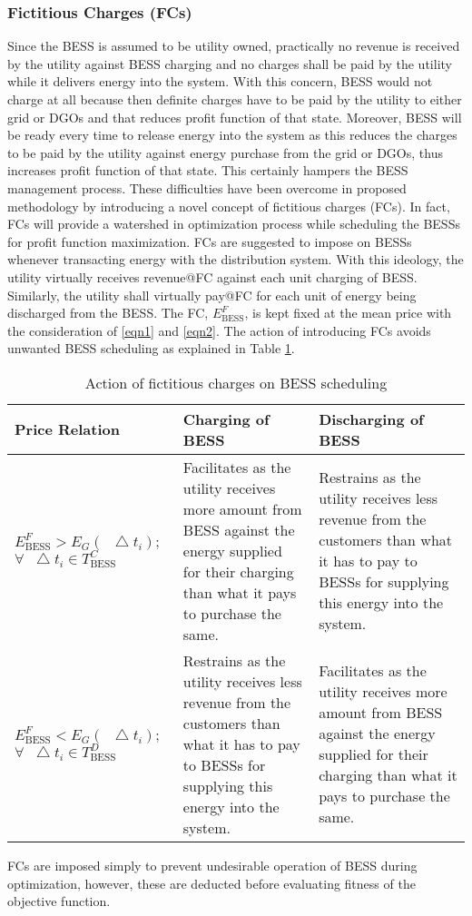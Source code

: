 \documentclass[journal]{IEEEtran}
\newcommand*\Laplace{\mathop{}\!\mathbin\bigtriangleup}
\begin{document}
\subsubsection{Fictitious Charges (FCs)}
	Since the BESS is assumed to be utility owned, practically no revenue is received by the utility against BESS charging and no charges shall be paid by the utility while it delivers energy into the system. With this concern, BESS would not charge at all because then definite charges have to be paid by the utility to either grid or DGOs and that reduces profit function of that state. Moreover, BESS will be ready every time to release energy into the system as this reduces the charges to be paid by the utility against energy purchase from the grid or DGOs, thus increases profit function of that state. This certainly hampers the BESS management process. These difficulties have been overcome in proposed methodology by introducing a novel concept of fictitious charges (FCs). In fact, FCs will provide a watershed in optimization process while scheduling the BESSs for profit function maximization. FCs are suggested to impose on BESSs whenever transacting energy with the distribution system. With this ideology, the utility virtually receives revenue@FC against each unit charging of BESS. Similarly, the utility shall virtually pay@FC for each unit of energy being discharged from the BESS. The FC, $E_{\text{BESS}}^{F}$, is kept fixed at the mean price with the consideration of \eqref{eqn1} and \eqref{eqn2}. The action of introducing FCs avoids unwanted BESS scheduling as explained in Table \ref{Table:1}.
\begin{table}
\caption{Action of fictitious charges on BESS scheduling}
\label{Table:1}
\centering
	\renewcommand{\arraystretch}{1.1}
\begin{tabular}{|p{1.05cm}|p{3.3cm}|p{3.2cm}|}
\hline
\rowcolor{gray!30} Price Relation & Charging of BESS & Discharging of BESS\\ 
\hline
\rowcolor{lime!30} $E_{\text{BESS}}^F> E_{G}(\Laplace t_{i});$ $\forall \Laplace t_i\in T_{\text{BESS}}^{C}$ & Facilitates as the utility receives more amount from BESS against the energy supplied for their charging than what it pays to purchase the same. & Restrains as the utility receives less revenue from the customers than what it has to pay to BESSs for supplying this energy into the system. \\
\hline
\rowcolor{orange!30} $E_{\text{BESS}}^F<E_{G}(\Laplace t_{i});$ $\forall \Laplace t_i\in T_{\text{BESS}}^{D}$ & Restrains as the utility receives less revenue from the customers than what it has to pay to BESSs for supplying this energy into the system.    & Facilitates as the utility receives more amount from BESS against the energy supplied for their charging than what it pays to purchase the same.\\ 
\hline
		\end{tabular}
	\vspace{-0.6cm}
	\end{table}
	FCs are imposed simply to prevent undesirable operation of BESS during optimization, however, these are deducted before evaluating fitness of the objective function.	
%	
\end{document}
